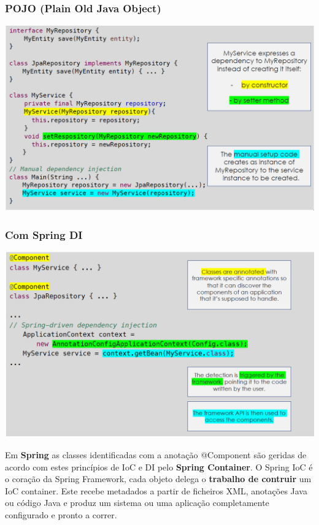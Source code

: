 \documentclass{article}
\begin{document}
\subsubsection*{POJO (Plain Old Java Object)}

\begin{center}
  \includegraphics[scale=0.4]{78}
\end{center}

\subsubsection*{Com Spring DI}

\begin{center}
  \includegraphics[scale=0.4]{79}
\end{center}

Em \textbf{Spring} as classes identificadas com a anotação @Component são geridas de
acordo com estes princípios de IoC e DI pelo \textbf{Spring Container}.
O Spring IoC é o coração da Spring Framework, cada objeto delega o \textbf{trabalho
de contruir} um IoC container. Este recebe metadados a partir de ficheiros XML,
anotações Java ou código Java e produz um sistema ou uma aplicação completamente
configurado e pronto a correr.
\end{document}
